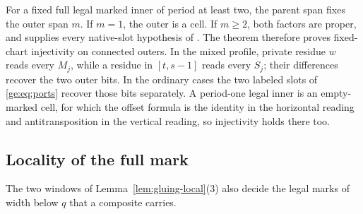 \documentclass[11pt,a4paper]{amsart}
\numberwithin{equation}{section}
\theoremstyle{plain}
\theoremstyle{definition}
\begin{document}
For a fixed full legal marked inner of period at least two, the
parent span fixes the outer span \(m\).  If \(m=1\), the outer
is a cell.  If \(m\ge2\), both factors are proper, and
 supplies every native-slot hypothesis of
.  The theorem therefore proves fixed-chart
injectivity on connected outers.  In the mixed
profile, private residue \(w\) reads every \(M_j\), while a residue
in \([t,s-1]\) reads every \(S_j\); their differences recover the
two outer bits.  In the ordinary cases the two labeled slots of
\eqref{ge:eq:ports} recover those bits separately.  A period-one
legal inner is an empty-marked cell, for which the offset formula
is the identity in the horizontal reading and antitransposition
in the vertical reading, so injectivity holds there too.

\subsection{Locality of the full mark}


The two windows of Lemma~\ref{lem:gluing-local}(3) also decide the legal marks of width below \(q\) that a composite carries.
\end{document}
